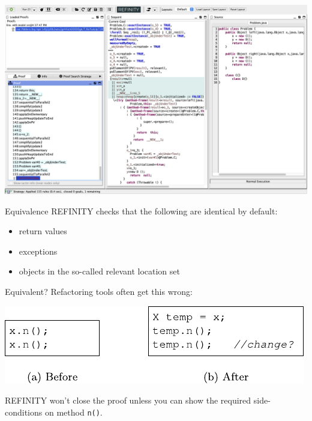 \begin{frame}\vspace*{-5mm}
  \begin{center}
    \includegraphics[scale=.25]{screenshots/SlideFail}
  \end{center}    
\end{frame}

\begin{frame}{Equivalence}
  REFINITY checks that the following are identical by default:
  
  \begin{itemize}
   \item return values
   \item exceptions
   \item objects in the so-called relevant location set
  \end{itemize}
\end{frame}




\begin{frame}{Equivalent?}
  Refactoring tools often get this wrong:

\begin{center}
\includegraphics[scale=1.2]{imported/Listing2}
\end{center}

  REFINITY won't close the proof unless you can show the required
  side-conditions on method \lstinline{n()}.

\end{frame}

